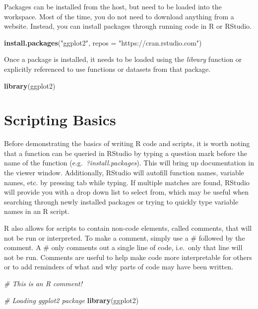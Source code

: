 \documentclass[
]{book}
\newenvironment{Shaded}{\begin{snugshade}}{\end{snugshade}}
\newcommand{\CommentTok}[1]{\textcolor[rgb]{0.56,0.35,0.01}{\textit{#1}}}
\newcommand{\DataTypeTok}[1]{\textcolor[rgb]{0.13,0.29,0.53}{#1}}
\newcommand{\KeywordTok}[1]{\textcolor[rgb]{0.13,0.29,0.53}{\textbf{#1}}}
\newcommand{\NormalTok}[1]{#1}
\newcommand{\StringTok}[1]{\textcolor[rgb]{0.31,0.60,0.02}{#1}}
\begin{document}
Packages can be installed from the host, but need to be loaded into the workspace. Most of the time, you do not need to download anything from a website. Instead, you can install packages through running code in R or RStudio.

\begin{Shaded}
\begin{Highlighting}[]
\KeywordTok{install.packages}\NormalTok{(}\StringTok{"ggplot2"}\NormalTok{, }\DataTypeTok{repos =} \StringTok{"https://cran.rstudio.com"}\NormalTok{)}
\end{Highlighting}
\end{Shaded}

Once a package is installed, it needs to be loaded using the \emph{library} function or explicitly referenced to use functions or datasets from that package.

\begin{Shaded}
\begin{Highlighting}[]
\KeywordTok{library}\NormalTok{(ggplot2)}
\end{Highlighting}
\end{Shaded}

\hypertarget{scripting-basics}{%
\section{Scripting Basics}\label{scripting-basics}}

Before demonstrating the basics of writing R code and scripts, it is worth noting that a function can be queried in RStudio by typing a question mark before the name of the function (e.g.~\emph{?install.packages}). This will bring up documentation in the viewer window. Additionally, RStudio will autofill function names, variable names, etc. by pressing tab while typing. If multiple matches are found, RStudio will provide you with a drop down list to select from, which may be useful when searching through newly installed packages or trying to quickly type variable names in an R script.

R also allows for scripts to contain non-code elements, called comments, that will not be run or interpreted. To make a comment, simply use a \# followed by the comment. A \# only comments out a single line of code, i.e.~only that line will not be run. Comments are useful to help make code more interpretable for others or to add reminders of what and why parts of code may have been written.

\begin{Shaded}
\begin{Highlighting}[]
\CommentTok{# This is an R comment!}

\CommentTok{# Loading ggplot2 package}
\KeywordTok{library}\NormalTok{(ggplot2)}
\end{Highlighting}
\end{Shaded}
\end{document}
